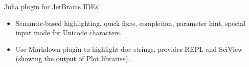 \documentclass{resume}
\begin{document}

Julia plugin for JetBrains IDEs
\begin{itemize}
  \item Semantic-based highlighting, quick fixes, completion, parameter hint, special input mode for Unicode characters.
  \item Use Markdown plugin to highlight doc strings, provides REPL and SciView (showing the output of Plot libraries).
\end{itemize}


\end{document}
